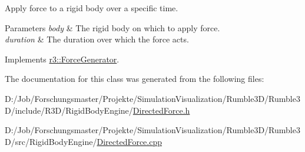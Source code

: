 Apply force to a rigid body over a specific time. 


\begin{DoxyParams}{Parameters}
{\em body} & The rigid body on which to apply force. \\
\hline
{\em duration} & The duration over which the force acts. \\
\hline
\end{DoxyParams}


Implements \mbox{\hyperlink{classr3_1_1_force_generator_a69bebbde8cef792d6636af50037af2aa}{r3\+::\+Force\+Generator}}.



The documentation for this class was generated from the following files\+:\begin{DoxyCompactItemize}
\item 
D\+:/\+Job/\+Forschungsmaster/\+Projekte/\+Simulation\+Visualization/\+Rumble3\+D/\+Rumble3\+D/include/\+R3\+D/\+Rigid\+Body\+Engine/\mbox{\hyperlink{_directed_force_8h}{Directed\+Force.\+h}}\item 
D\+:/\+Job/\+Forschungsmaster/\+Projekte/\+Simulation\+Visualization/\+Rumble3\+D/\+Rumble3\+D/src/\+Rigid\+Body\+Engine/\mbox{\hyperlink{_directed_force_8cpp}{Directed\+Force.\+cpp}}\end{DoxyCompactItemize}
